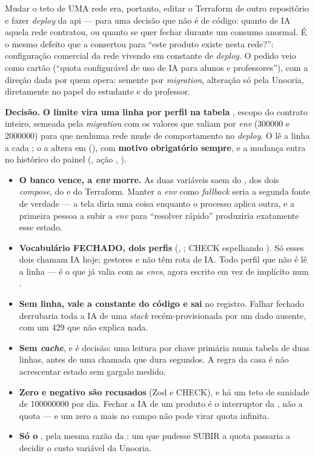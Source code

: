 Mudar o teto de UMA rede era, portanto, editar o Terraform de outro repositório
e fazer \emph{deploy} da api --- para uma decisão que não é de código: quanto de
IA aquela rede contratou, ou quanto se quer fechar durante um consumo anormal.
É o mesmo defeito que a  consertou para \enquote{este produto
existe nesta rede?}: configuração comercial da rede vivendo em constante de
\emph{deploy}. O pedido veio como cartão (\enquote{quota configurável de uso de
IA para alunos e professores}), com a direção dada por quem opera: semente por
\emph{migration}, alteração só pela Unooria, diretamente no papel do estudante
e do professor.

\textbf{Decisão.} \textbf{O limite vira uma linha por perfil na tabela
}, escopo do contrato inteiro, semeada pela \emph{migration} com
os valores que valiam por \emph{env} (\num{300000} e \num{2000000}) para que
nenhuma rede mude de comportamento no \emph{deploy}. O  lê a
linha a cada ; o  a altera em 
(), com \textbf{motivo obrigatório
sempre}, e a mudança entra no histórico do painel (,
ação , ).

\begin{itemize}
  \item \textbf{O banco vence, a \emph{env} morre.} As duas variáveis saem do
    , dos dois \emph{compose}, do  e do Terraform.
    Manter a \emph{env} como \emph{fallback} seria a segunda fonte de verdade
    --- a tela diria uma coisa enquanto o processo aplica outra, e a primeira
    pessoa a subir a \emph{env} para \enquote{resolver rápido} produziria
    exatamente esse estado.
  \item \textbf{Vocabulário FECHADO, dois perfis} (,
    ; CHECK espelhando ). Só esses dois
    chamam IA hoje; gestores e  não têm rota de IA. Todo perfil que
    não é  lê a linha  --- é o que já valia com as
    \emph{envs}, agora escrito em vez de implícito num .
  \item \textbf{Sem linha, vale a constante do código e sai
    } no registro. Falhar fechado derrubaria toda a IA
    de uma \emph{stack} recém-provisionada por um dado ausente, com um 429 que
    não explica nada.
  \item \textbf{Sem \emph{cache}}, e é decisão: uma leitura por chave primária
    numa tabela de duas linhas, antes de uma chamada que dura segundos. A regra
    da casa é não acrescentar estado sem gargalo medido.
  \item \textbf{Zero e negativo são recusados} (Zod e CHECK), e há um teto de
    sanidade de \num{100000000} por dia. Fechar a IA de um produto é o
    interruptor da , não a quota --- e um zero a mais no campo não
    pode virar quota infinita.
  \item \textbf{Só o }, pela mesma razão da : um
     que pudesse SUBIR a quota passaria a decidir o custo
    variável da Unooria.
\end{itemize}

